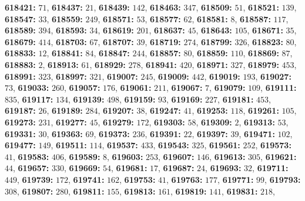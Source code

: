 \textsf{\bfseries 618421:} $71$, \textsf{\bfseries 618437:} $21$, \textsf{\bfseries 618439:} $142$, \textsf{\bfseries 618463:} $347$, \textsf{\bfseries 618509:} $51$, \textsf{\bfseries 618521:} $139$, \textsf{\bfseries 618547:} $33$, \textsf{\bfseries 618559:} $249$, \textsf{\bfseries 618571:} $53$, \textsf{\bfseries 618577:} $62$, \textsf{\bfseries 618581:} $8$, \textsf{\bfseries 618587:} $117$, \textsf{\bfseries 618589:} $394$, \textsf{\bfseries 618593:} $34$, \textsf{\bfseries 618619:} $201$, \textsf{\bfseries 618637:} $45$, \textsf{\bfseries 618643:} $105$, \textsf{\bfseries 618671:} $35$, \textsf{\bfseries 618679:} $414$, \textsf{\bfseries 618703:} $67$, \textsf{\bfseries 618707:} $39$, \textsf{\bfseries 618719:} $274$, \textsf{\bfseries 618799:} $326$, \textsf{\bfseries 618823:} $80$, \textsf{\bfseries 618833:} $12$, \textsf{\bfseries 618841:} $84$, \textsf{\bfseries 618847:} $244$, \textsf{\bfseries 618857:} $80$, \textsf{\bfseries 618859:} $110$, \textsf{\bfseries 618869:} $87$, \textsf{\bfseries 618883:} $2$, \textsf{\bfseries 618913:} $61$, \textsf{\bfseries 618929:} $278$, \textsf{\bfseries 618941:} $420$, \textsf{\bfseries 618971:} $327$, \textsf{\bfseries 618979:} $453$, \textsf{\bfseries 618991:} $323$, \textsf{\bfseries 618997:} $321$, \textsf{\bfseries 619007:} $245$, \textsf{\bfseries 619009:} $442$, \textsf{\bfseries 619019:} $193$, \textsf{\bfseries 619027:} $73$, \textsf{\bfseries 619033:} $260$, \textsf{\bfseries 619057:} $176$, \textsf{\bfseries 619061:} $211$, \textsf{\bfseries 619067:} $7$, \textsf{\bfseries 619079:} $109$, \textsf{\bfseries 619111:} $835$, \textsf{\bfseries 619117:} $134$, \textsf{\bfseries 619139:} $498$, \textsf{\bfseries 619159:} $93$, \textsf{\bfseries 619169:} $227$, \textsf{\bfseries 619181:} $453$, \textsf{\bfseries 619187:} $26$, \textsf{\bfseries 619189:} $284$, \textsf{\bfseries 619207:} $38$, \textsf{\bfseries 619247:} $41$, \textsf{\bfseries 619253:} $118$, \textsf{\bfseries 619261:} $105$, \textsf{\bfseries 619273:} $231$, \textsf{\bfseries 619277:} $45$, \textsf{\bfseries 619279:} $172$, \textsf{\bfseries 619303:} $58$, \textsf{\bfseries 619309:} $2$, \textsf{\bfseries 619313:} $53$, \textsf{\bfseries 619331:} $30$, \textsf{\bfseries 619363:} $69$, \textsf{\bfseries 619373:} $236$, \textsf{\bfseries 619391:} $22$, \textsf{\bfseries 619397:} $39$, \textsf{\bfseries 619471:} $102$, \textsf{\bfseries 619477:} $149$, \textsf{\bfseries 619511:} $114$, \textsf{\bfseries 619537:} $433$, \textsf{\bfseries 619543:} $325$, \textsf{\bfseries 619561:} $252$, \textsf{\bfseries 619573:} $41$, \textsf{\bfseries 619583:} $406$, \textsf{\bfseries 619589:} $8$, \textsf{\bfseries 619603:} $253$, \textsf{\bfseries 619607:} $146$, \textsf{\bfseries 619613:} $305$, \textsf{\bfseries 619621:} $44$, \textsf{\bfseries 619657:} $330$, \textsf{\bfseries 619669:} $54$, \textsf{\bfseries 619681:} $17$, \textsf{\bfseries 619687:} $24$, \textsf{\bfseries 619693:} $32$, \textsf{\bfseries 619711:} $449$, \textsf{\bfseries 619739:} $172$, \textsf{\bfseries 619741:} $162$, \textsf{\bfseries 619753:} $41$, \textsf{\bfseries 619763:} $177$, \textsf{\bfseries 619771:} $99$, \textsf{\bfseries 619793:} $308$, \textsf{\bfseries 619807:} $280$, \textsf{\bfseries 619811:} $155$, \textsf{\bfseries 619813:} $161$, \textsf{\bfseries 619819:} $141$, \textsf{\bfseries 619831:} $218$, 
